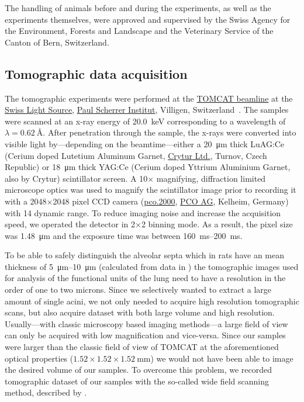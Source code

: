 \documentclass[%
	draft,
	paper=a4,%
	abstract=true,%
	]{scrartcl}
\begin{document}
The handling of animals before and during the experiments, as well as the experiments themselves, were approved and supervised by the Swiss Agency for the Environment, Forests and Landscape and the Veterinary Service of the Canton of Bern, Switzerland.

\subsection{Tomographic data acquisition}
The tomographic experiments were performed at the \href{http://www.psi.ch/sls/tomcat/}{TOMCAT beamline} at the \href{http://www.psi.ch/sls/}{Swiss Light Source}, \href{http://www.psi.ch/}{Paul Scherrer Institut}, Villigen, Switzerland~\cite{Stampanoni2006a}. The samples were scanned at an x-ray energy of \SI{20.0}{\kilo\electronvolt} corresponding to a wavelength of \(\lambda=\SI{0.62}{\angstrom}\). %
After penetration through the sample, the x-rays were converted into visible light by---depending on the beamtime---either a \SI{20}{\micro\meter} thick LuAG:Ce (Cerium doped Lutetium Aluminum Garnet, \href{http://www.crytur.cz/}{Crytur Ltd.}, Turnov, Czech Republic) or \SI{18}{\micro\meter} thick YAG:Ce (Cerium doped Yttrium Aluminium Garnet, also by Crytur) scintillator screen. A 10\(\times\) magnifying, diffraction limited microscope optics was used to magnify the scintillator image prior to recording it with a 2048\(\times\)2048 pixel CCD camera (\href{http://www.pco.de/sensitive-cameras/pco2000/}{pco.2000}, \href{http://www.pco.de/}{PCO AG}, Kelheim, Germany) with \SI{14}{\bit} dynamic range. To reduce imaging noise and increase the acquisition speed, we operated the detector in 2\(\times\)2 binning mode. As a result, the pixel size was \SI{1.48}{\micro\meter} and the exposure time was between \SIrange{160}{200}{\milli\second}.

To be able to safely distinguish the alveolar septa which in rats have an mean thickness of \SIrange{5}{10}{\micro\meter} (calculated from data in \citet{Burri1974}) the tomographic images used for analysis of the functional units of the lung need to have a resolution in the order of one to two microns. Since we selectively wanted to extract a large amount of single acini, we not only needed to acquire high resolution tomographic scans, but also acquire dataset with both large volume and high resolution. Usually---with classic microscopy based imaging methods---a large field of view can only be acquired with low magnification and vice-versa. Since our samples were larger than the classic field of view of TOMCAT at the aforementioned optical properties (\(1.52\times1.52\times\SI{1.52}{\milli\meter}\)) we would not have been able to image the desired volume of our samples. To overcome this problem, we recorded tomographic dataset of our samples with the so-called wide field scanning method, described by \citet{Haberthuer2010a}.
\end{document}
